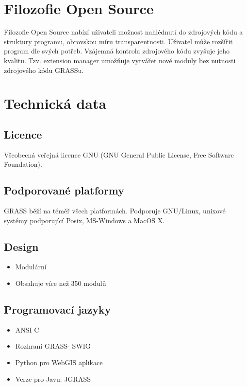\documentclass[notumble,a4paper,10pt,nofoldmark]{leaflet}
\begin{document}
\section{Filozofie Open Source}

Filozofie Open Source nabízí uživateli možnost nahlédnutí do
zdrojových kódu a struktury programu, obrovskou míru
transparentnosti. Uživatel může rozšířit program dle svých
potřeb. Vzájemná kontrola zdrojového kódu zvyšuje jeho
kvalitu. Tzv. extension manager umožňuje vytvářet nové moduly bez
nutnosti zdrojového kódu GRASSu.

\section{Technická data}

\subsection{Licence}

Všeobecná veřejná licence GNU (GNU General Public License, Free
Software Foundation).

\subsection{Podporované platformy}

GRASS běží na téměř všech platformách. Podporuje GNU/Linux, unixové
systémy podporující Posix, MS-Windows a MacOS X.

\subsection{Design}

\begin{itemize}
\item Modulární
\item Obsahuje více než 350 modulů
\end{itemize}

\subsection{Programovací jazyky}

\begin{itemize}
\item ANSI C
\item Rozhraní GRASS- SWIG
\item Python pro WebGIS aplikace
\item Verze pro Javu: JGRASS
\end{itemize}
\end{document}
